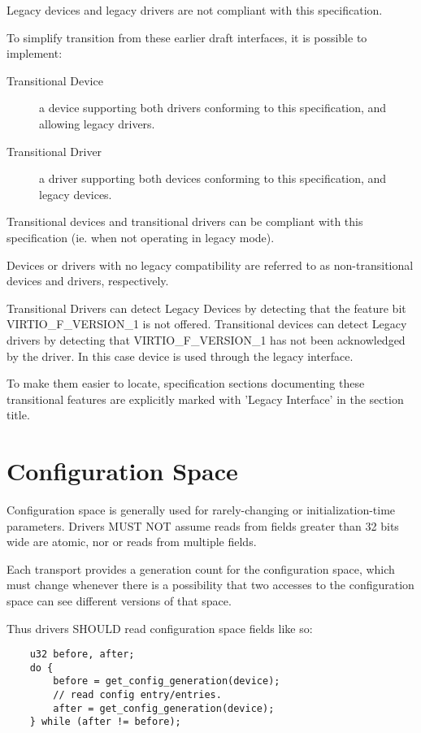 Legacy devices and legacy drivers are not compliant with this
specification.

To simplify transition from these earlier draft interfaces,
it is possible to implement:

\begin{description}
\item[Transitional Device]
        a device supporting both drivers conforming to this
        specification, and allowing legacy drivers.

\item[Transitional Driver]
        a driver supporting both devices conforming to this
        specification, and legacy devices.
\end{description}

Transitional devices and transitional drivers can be compliant with
this specification (ie. when not operating in legacy mode).

Devices or drivers with no legacy compatibility are referred to as
non-transitional devices and drivers, respectively.

Transitional Drivers can detect Legacy Devices by detecting that
the feature bit VIRTIO_F_VERSION_1 is not offered.
Transitional devices can detect Legacy drivers by detecting that
VIRTIO_F_VERSION_1 has not been acknowledged by the driver.
In this case device is used through the legacy interface.

To make them easier to locate, specification sections documenting
these transitional features are explicitly marked with 'Legacy
Interface' in the section title.

\section{Configuration Space}\label{sec:Basic Facilities of a Virtio Device / Configuration Space}

Configuration space is generally used for rarely-changing or
initialization-time parameters.  Drivers MUST NOT assume reads from
fields greater than 32 bits wide are atomic, nor or reads from
multiple fields.

Each transport provides a generation count for the configuration
space, which must change whenever there is a possibility that two
accesses to the configuration space can see different versions of that
space.

Thus drivers SHOULD read configuration space fields like so:

\begin{lstlisting}
	u32 before, after;
	do {
		before = get_config_generation(device);
		// read config entry/entries.
		after = get_config_generation(device);
	} while (after != before);
\end{lstlisting}

